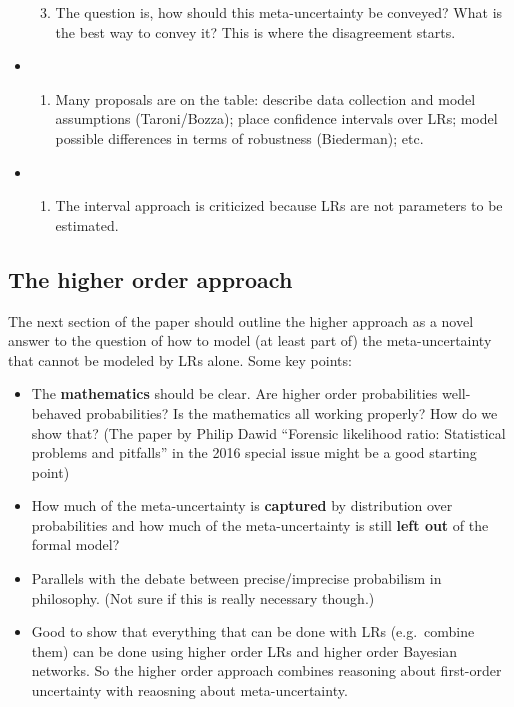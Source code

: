 \documentclass[
  10pt,
  dvipsnames,enabledeprecatedfontcommands]{scrartcl}
\providecommand{\tightlist}{%
  \setlength{\itemsep}{0pt}\setlength{\parskip}{0pt}}
\begin{document}
\begin{itemize}
\begin{enumerate}
  \setcounter{enumi}{2}
  \tightlist
  \item
    The question is, how should this meta-uncertainty be conveyed? What
    is the best way to convey it? This is where the disagreement starts.
  \end{enumerate}
\item
  \begin{enumerate}
  \def\labelenumi{(\roman{enumi})}
  \setcounter{enumi}{3}
  \tightlist
  \item
    Many proposals are on the table: describe data collection and model
    assumptions (Taroni/Bozza); place confidence intervals over LRs;
    model possible differences in terms of robustness (Biederman); etc.
  \end{enumerate}
\item
  \begin{enumerate}
  \def\labelenumi{(\alph{enumi})}
  \setcounter{enumi}{21}
  \tightlist
  \item
    The interval approach is criticized because LRs are not parameters
    to be estimated.
  \end{enumerate}
\end{itemize}

\hypertarget{the-higher-order-approach}{%
\subsection{The higher order approach}\label{the-higher-order-approach}}

The next section of the paper should outline the higher approach as a
novel answer to the question of how to model (at least part of) the
meta-uncertainty that cannot be modeled by LRs alone. Some key points:

\begin{itemize}
\item
  The \textbf{mathematics} should be clear. Are higher order
  probabilities well-behaved probabilities? Is the mathematics all
  working properly? How do we show that? (The paper by Philip Dawid
  ``Forensic likelihood ratio: Statistical problems and pitfalls'' in
  the 2016 special issue might be a good starting point)
\item
  How much of the meta-uncertainty is \textbf{captured} by distribution
  over probabilities and how much of the meta-uncertainty is still
  \textbf{left out} of the formal model?
\item
  Parallels with the debate between precise/imprecise probabilism in
  philosophy. (Not sure if this is really necessary though.)
\item
  Good to show that everything that can be done with LRs (e.g.~combine
  them) can be done using higher order LRs and higher order Bayesian
  networks. So the higher order approach combines reasoning about
  first-order uncertainty with reaosning about meta-uncertainty.
\end{itemize}
\end{document}
